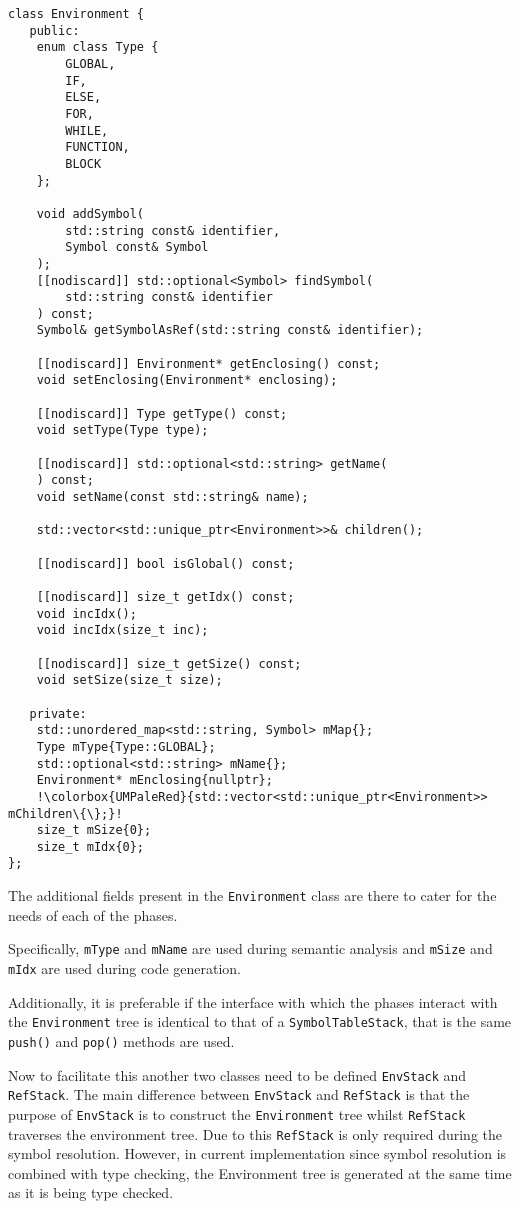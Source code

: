 \begin{lstlisting}[escapechar=!,caption={The
\texttt{Environment} class with \texttt{mChildren} highlighted
(backend/Environment.hpp)}, label=lst:envclass]
class Environment {
   public:
    enum class Type {
        GLOBAL,
        IF,
        ELSE,
        FOR,
        WHILE,
        FUNCTION,
        BLOCK
    };

    void addSymbol(
        std::string const& identifier,
        Symbol const& Symbol
    );
    [[nodiscard]] std::optional<Symbol> findSymbol(
        std::string const& identifier
    ) const;
    Symbol& getSymbolAsRef(std::string const& identifier);

    [[nodiscard]] Environment* getEnclosing() const;
    void setEnclosing(Environment* enclosing);

    [[nodiscard]] Type getType() const;
    void setType(Type type);

    [[nodiscard]] std::optional<std::string> getName(
    ) const;
    void setName(const std::string& name);

    std::vector<std::unique_ptr<Environment>>& children();

    [[nodiscard]] bool isGlobal() const;

    [[nodiscard]] size_t getIdx() const;
    void incIdx();
    void incIdx(size_t inc);

    [[nodiscard]] size_t getSize() const;
    void setSize(size_t size);

   private:
    std::unordered_map<std::string, Symbol> mMap{};
    Type mType{Type::GLOBAL};
    std::optional<std::string> mName{};
    Environment* mEnclosing{nullptr};
    !\colorbox{UMPaleRed}{std::vector<std::unique_ptr<Environment>> mChildren\{\};}!
    size_t mSize{0};
    size_t mIdx{0};
};
\end{lstlisting}

The additional fields present in the \texttt{Environment} class
are there to cater for the needs of each of the phases.

Specifically,\label{sss:extrafields} \texttt{mType} and
\texttt{mName} are used during semantic analysis and
\texttt{mSize} and \texttt{mIdx} are used during code
generation.

Additionally, it is preferable if the interface with which the
phases interact with the \texttt{Environment} tree is identical
to that of a \texttt{SymbolTableStack}, that is the same
\texttt{push()} and \texttt{pop()} methods are used.

Now to facilitate this another two classes need to be defined
\texttt{EnvStack} and \texttt{RefStack}. The main difference
between \texttt{EnvStack} and \texttt{RefStack} is that the
purpose of \texttt{EnvStack} is to construct the
\texttt{Environment} tree whilst \texttt{RefStack} traverses the
environment tree. Due to this \texttt{RefStack} is only required
during the symbol resolution. However, in current implementation
since symbol resolution is combined with type checking, the
Environment tree is generated at the same time as it is being
type checked.

